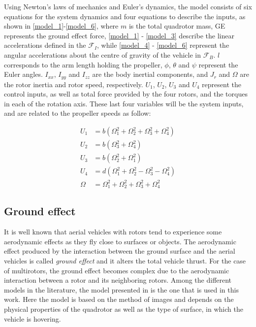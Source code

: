 \documentclass[conference]{IEEEtran}
\begin{document}
Using Newton's laws of mechanics and Euler's dynamics, the model consists of six equations for the system dynamics and four equations to describe the inputs, as shown in \eqref{model_1}-\eqref{model_6}, where $m$ is the total quadrotor mass, GE represents the ground effect force, \eqref{model_1} - \eqref{model_3} describe the linear accelerations defined in the $\mathcal{F}_{I}$, while \eqref{model_4} - \eqref{model_6} represent the angular accelerations about the centre of gravity of the vehicle in $\mathcal{F}_{B}$. $l$ corresponds to the arm length holding the propeller, $\phi$, $\theta$ and $\psi$ represent the Euler angles. $I_{xx}$, $I_{yy}$ and $I_{zz}$ are the body inertial components, and $J_{r}$ and $\Omega$ are the rotor inertia and rotor speed, respectively. $U_{1}$, $U_{2}$, $U_{3}$ and $U_{4}$ represent the control inputs, as well as total force provided by the four rotors, and the torques in each of the rotation axis. These last four variables will be the system inputs, and are related to the propeller speeds as follow: 

\begin{align}  
U_{1}  &= b(\Omega_{1}^{2} + \Omega_{2}^{2} + \Omega_{3}^{2} + \Omega_{4}^{2}) \label{model_7}\\ 
U_{2}  &= b(\Omega_{3}^{2} + \Omega_{4}^{2}) \label{model_8} \\
U_{3}  &= b(\Omega_{2}^{2} + \Omega_{1}^{2}) \label{model_9} \\
U_{4}  &= d(\Omega_{1}^{2} + \Omega_{2}^{2} - \Omega_{3}^{2} - \Omega_{4}^{2}) \label{model_10} \\
\Omega &= \Omega_{1}^{2} + \Omega_{2}^{2} + \Omega_{3}^{2} + \Omega_{4}^{2} \label{model_11}
\end{align}

\subsection{Ground effect}
It is well known that aerial vehicles with rotors tend to experience some aerodynamic effects as they fly close to surfaces or objects. The aerodynamic effect produced by the interaction between the ground surface and the aerial vehicles is called \textit{ground effect} and it alters the total vehicle thrust. For the case of multirotors, the ground effect becomes complex due to the aerodynamic interaction between a rotor and its neighboring rotors. Among the different models in the literature, the model presented in \cite{DenaRuiz2019_1} is the one that is used in this work. Here the model is based on the method of images and depends on the physical properties of the quadrotor as well as the type of surface, in which the vehicle is hovering.
\end{document}
